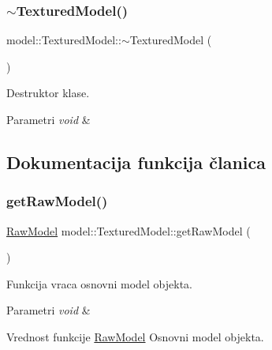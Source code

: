\subsubsection{\texorpdfstring{$\sim$\+Textured\+Model()}{~TexturedModel()}}
{\footnotesize\ttfamily model\+::\+Textured\+Model\+::$\sim$\+Textured\+Model (\begin{DoxyParamCaption}{ }\end{DoxyParamCaption})}



Destruktor klase. 


\begin{DoxyParams}{Parametri}
{\em void} & \\
\hline
\end{DoxyParams}


\subsection{Dokumentacija funkcija članica}
\mbox{\label{classmodel_1_1TexturedModel_a8074adea6d7e368690a977b4ad571378}} 
\subsubsection{\texorpdfstring{get\+Raw\+Model()}{getRawModel()}}
{\footnotesize\ttfamily \hyperlink{classmodel_1_1RawModel}{Raw\+Model} model\+::\+Textured\+Model\+::get\+Raw\+Model (\begin{DoxyParamCaption}\item[{void}]{ }\end{DoxyParamCaption})}



Funkcija vraca osnovni model objekta. 


\begin{DoxyParams}{Parametri}
{\em void} & \\
\hline
\end{DoxyParams}
\begin{DoxyReturn}{Vrednost funkcije}
\hyperlink{classmodel_1_1RawModel}{Raw\+Model} Osnovni model objekta. 
\end{DoxyReturn}
\mbox{\label{classmodel_1_1TexturedModel_ad2bb5d174a506bd9d1f807e84aba4cdc}} 

